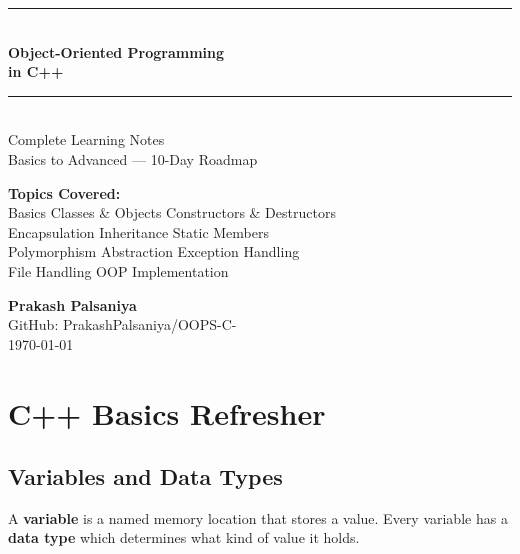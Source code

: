 \documentclass[12pt,a4paper]{report}
\begin{document}
\begin{titlepage}
\centering
\vspace*{2cm}
{\color{primary}\rule{\textwidth}{3pt}}\\[0.5cm]
{\Huge\bfseries\color{titlecolor} Object-Oriented Programming}\\[0.3cm]
{\huge\bfseries\color{titlecolor} in C++}\\[0.5cm]
{\color{primary}\rule{\textwidth}{3pt}}\\[1.5cm]
{\Large\color{lightgray} Complete Learning Notes}\\[0.3cm]
{\large\color{lightgray} Basics to Advanced --- 10-Day Roadmap}\\[2cm]
\begin{tcolorbox}[colback=primary!10, colframe=primary, width=0.8\textwidth]
\centering
\textbf{Topics Covered:}\\[0.3cm]
Basics \textbullet{} Classes \& Objects \textbullet{} Constructors \& Destructors\\[0.2cm]
Encapsulation \textbullet{} Inheritance \textbullet{} Static Members\\[0.2cm]
Polymorphism \textbullet{} Abstraction \textbullet{} Exception Handling\\[0.2cm]
File Handling \textbullet{} OOP Implementation
\end{tcolorbox}
\vfill
{\large\bfseries Prakash Palsaniya}\\[0.2cm]
{\color{lightgray} GitHub: PrakashPalsaniya/OOPS-C-}\\[0.5cm]
{\color{lightgray}\today}
\end{titlepage}

\tableofcontents
\newpage

\chapter{C++ Basics Refresher}

\section{Variables and Data Types}

A \textbf{variable} is a named memory location that stores a value.
Every variable has a \textbf{data type} which determines what kind of value it holds.
\end{document}

